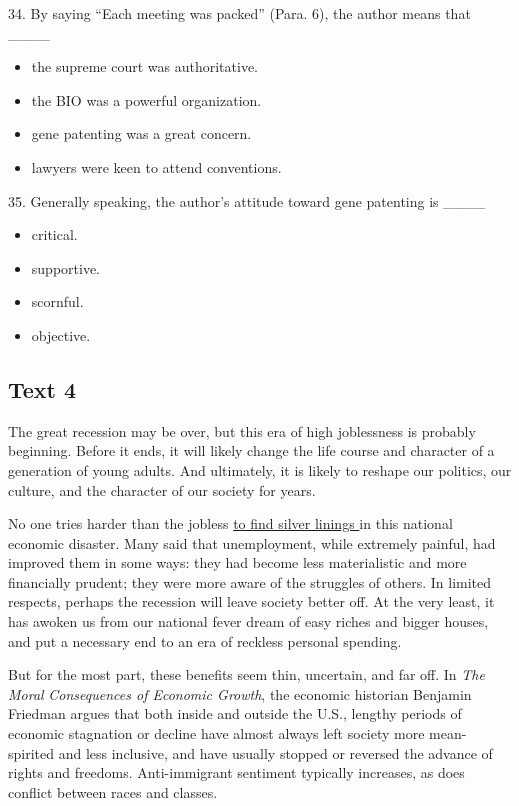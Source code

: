 \documentclass[UTF8,11pt]{ctexart}
\begin{document}
34. By saying “Each meeting was packed” (Para. 6), the author means that \_\_\_\_


\begin{itemize}[leftmargin=2em,itemsep=.2em,topsep=.4em]\item[A.] the supreme court was authoritative.
\item[B.] the BIO was a powerful organization.
\item[C.] gene patenting was a great concern.
\item[D.] lawyers were keen to attend conventions.
\end{itemize}

35. Generally speaking, the author’s attitude toward gene patenting is \_\_\_\_


\begin{itemize}[leftmargin=2em,itemsep=.2em,topsep=.4em]\item[A.] critical.
\item[B.] supportive.
\item[C.] scornful.
\item[D.] objective.
\end{itemize}

\subsection*{\textbf{Text 4}}


The great recession may be over, but this era of high joblessness is probably beginning. Before it ends, it will likely change the life course and character of a generation of young adults. And ultimately, it is likely to reshape our politics, our culture, and the character of our society for years.


No one tries harder than the jobless \uline{to find silver linings }in this national economic disaster. Many said that unemployment, while extremely painful, had improved them in some ways: they had become less materialistic and more financially prudent; they were more aware of the struggles of others. In limited respects, perhaps the recession will leave society better off. At the very least, it has awoken us from our national fever dream of easy riches and bigger houses, and put a necessary end to an era of reckless personal spending.


But for the most part, these benefits seem thin, uncertain, and far off. In \textit{The Moral} \textit{Consequences of Economic Growth}, the economic historian Benjamin Friedman argues that both inside and outside the U.S., lengthy periods of economic stagnation or decline have almost always left society more mean-spirited and less inclusive, and have usually stopped or reversed the advance of rights and freedoms. Anti-immigrant sentiment typically increases, as does conflict between races and classes.
\end{document}
